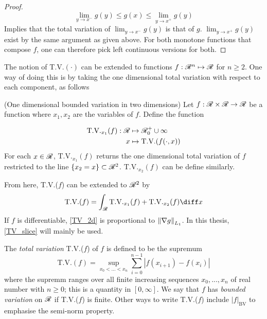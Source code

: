 \begin{definition}
\begin{proof}
	 \begin{equation}
	 	\lim_{y \rightarrow x^-} g(y) \leq g(x) \leq \lim_{y \rightarrow x^+} g(y) \label{montone_left_right_lim2}
	 \end{equation}
 	Implies that the total variation of $\lim_{y \rightarrow x^-} g(y)$ is that of $g$. $\lim_{y \rightarrow x^+} g(y)$ exist by the same argument as given above. For both monotone functions that compose $f$, one can therefore pick left continuous versions for both.
 	
\end{proof}
The notion of T.V.$(\cdot)$ can be extended to functions $f:\mathscr{R}^n \mapsto \mathscr{R}$ for $n \geq 2$. One way of doing this is by taking the one dimensional total variation with respect to each component, as follows

\begin{definition}(One dimensional bounded variation in two dimensions)
	Let $f : \mathscr{R}\times\mathscr{R} \rightarrow \mathscr{R}$ be a function where $x_1, x_2$ are the variables of $f$. Define the function 
	
	\begin{align} \label{TV_slice}
		\text{T.V.}_{x_1}(f) : \mathscr{R} &\mapsto \mathscr{R}^+_0 \cup \infty \\ 	
		x &\mapsto \text{T.V.}(f(\cdot, x)) \nonumber
	\end{align}
	 For each $x \in \mathscr{R}$, $\text{T.V.}_{x_1}(f)$ returns the one dimensional total variation of $f$ restricted to the line $\{x_2 = x\} \subset \mathscr{R}^2$.  $\text{T.V.}_{x_2}(f)$ can be define similarly. 
\end{definition} 

\begin{remark}
	From here, T.V.($f$) can be extended to $\mathscr{R}^2$ by
	\begin{equation} \label{TV_2d}
		\text{T.V.}(f) = \int_\R \text{T.V.}_{x_1}(f) + \text{T.V.}_{x_2}(f) \diff x
	\end{equation}
	   If $f$ is differentiable, \eqref{TV_2d} is proportional to $\left\lVert\nabla g\right\rVert_{L_1}$. In this thesis, \eqref{TV_slice} will mainly be used. 
\end{remark}
	
	
	The \emph{total variation} T.V.($f$) of $f$ is defined to be the supremum
	\begin{equation}
		\text{T.V.}(f) = \sup_{x_0 < ... < x_n} \sum_{i = 0}^{n-1} \left| f(x_{i+1}) - f(x_i)\right|
	\end{equation} 
	where the supremm ranges over all finite increasing sequences $x_0, ..., x_n$ of real number with $n \geq 0$; this is a quantity in $[0, \infty]$. We say that $f$ has \emph{bounded variation} on $\mathscr{R}$ if T.V.($f$) is finite. Other ways to write T.V.($f$) include $\left|f\right|_{\text{BV}}$ to emphasise the semi-norm property.


\end{definition}
